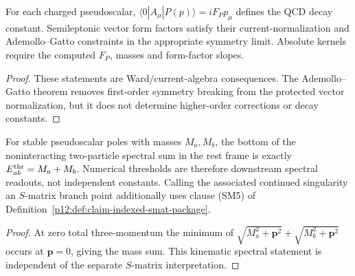 \documentclass[12pt,a4paper]{article}
\begin{document}
\begin{corollary}
\label{p11:cor:native-charged-pseudoscalar-weak-kernels}

For each charged pseudoscalar, \(\langle0|A_\mu|P(p)\rangle=iF_Pp_\mu\) defines the QCD decay constant.  Semileptonic vector form factors satisfy their current-normalization and Ademollo--Gatto constraints in the appropriate symmetry limit.  Absolute kernels require the computed \(F_P\), masses and form-factor slopes.
\label{p11:eq:native-leptonic-qcd-kernel}
\label{p11:eq:native-kell3-normalization}
\end{corollary}
\begin{proof}

These statements are Ward/current-algebra consequences.  The Ademollo--Gatto theorem removes first-order symmetry breaking from the protected vector normalization, but it does not determine higher-order corrections or decay constants.
\end{proof}

\begin{corollary}
\label{p11:cor:native-two-pseudoscalar-thresholds}

For stable pseudoscalar poles with masses \(M_a,M_b\), the bottom of the
noninteracting two-particle spectral sum in the rest frame is exactly
\(E_{ab}^{\rm thr}=M_a+M_b\).  Numerical thresholds are therefore downstream
spectral readouts, not independent constants.  Calling the associated
continued singularity an \(S\)-matrix branch point additionally uses
clause \textnormal{(SM5)} of
Definition~\ref{p12:def:claim-indexed-smat-package}.

\end{corollary}
\begin{proof}

At zero total three-momentum the minimum of
\(\sqrt{M_a^2+\mathbf p^2}+\sqrt{M_b^2+\mathbf p^2}\) occurs at
\(\mathbf p=0\), giving the mass sum.  This kinematic spectral statement is
independent of the separate \(S\)-matrix interpretation.
\end{proof}
\end{document}
